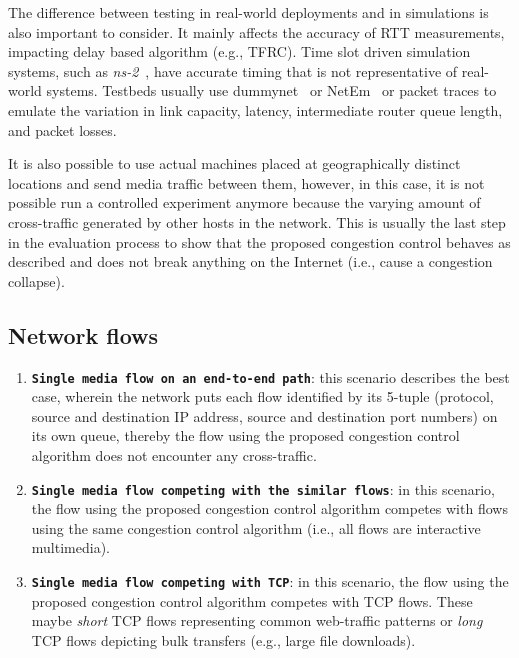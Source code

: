 The difference between testing in real-world deployments and in simulations is
also important to consider. It mainly affects the accuracy of RTT
measurements, impacting delay based algorithm (e.g., TFRC). Time slot driven
simulation systems, such as \emph{ns-2}~\cite{ns2}, have accurate timing that
is not representative of real-world systems. Testbeds usually use
dummynet~\cite{Carbone:2010p3502} or NetEm~\cite{netem} or packet traces to
emulate the variation in link capacity, latency, intermediate router queue
length, and packet losses. 

It is also possible to use actual machines placed at geographically distinct
locations and send media traffic between them, however, in this case, it is
not possible run a controlled experiment anymore because the varying amount of
cross-traffic generated by other hosts in the network. This is usually the
last step in the evaluation process to show that the proposed congestion
control behaves as described and does not break anything on the Internet
(i.e., cause a congestion collapse).

\subsection{Network flows}

\begin{enumerate}
\setlength{\itemsep}{0pt}

\item \textbf{\texttt{Single media flow on an end-to-end path}}: this scenario
describes the best case, wherein the network puts each flow identified by its
5-tuple (protocol, source and destination IP address, source and destination
port numbers) on its own queue, thereby the flow using the proposed congestion
control algorithm does not encounter any cross-traffic.

\item \textbf{\texttt{Single media flow competing with the similar flows}}: in
this scenario, the flow using the proposed congestion control algorithm
competes with flows using the same congestion control algorithm (i.e., all
flows are interactive multimedia).


\item \textbf{\texttt{Single media flow competing with TCP}}: in this
scenario, the flow using the proposed congestion control algorithm competes
with TCP flows. These maybe \emph{short} TCP flows representing common
web-traffic patterns or \emph{long} TCP flows depicting bulk transfers (e.g.,
large file downloads).

\end{enumerate}

